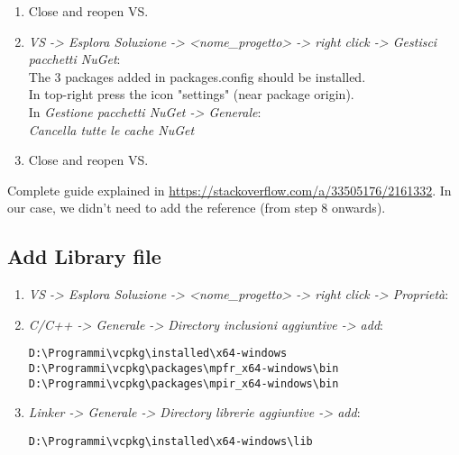 \documentclass[10pt, english, openany]{report}
\begin{document}
\begin{appendices}
\begin{enumerate}
\begin{lstlisting}
.\..\packages\NuGet.CommandLine.5.5.1\tools\NuGet.exe Install -NonInteractive -OutputDirectory packages packages.config
\end{lstlisting}
	
\item Close and reopen VS.

\item \textit{VS -> Esplora Soluzione -> <nome\_progetto> -> right click -> Gestisci pacchetti NuGet}: \\
The 3 packages added in packages.config should be installed.\\
In top-right press the icon "settings" (near package origin). \\
In \textit{Gestione pacchetti NuGet -> Generale}: \\

	\textit{Cancella tutte le cache NuGet}

\item Close and reopen VS.
\end{enumerate}

Complete guide explained in \href{https://stackoverflow.com/a/33505176/2161332}{https://stackoverflow.com/a/33505176/2161332}. In our case, we didn't need to add the reference (from step 8 onwards).


\subsection{Add Library file}
\begin{enumerate}
\item \textit{VS -> Esplora Soluzione -> <nome\_progetto> -> right click -> Proprietà}:

\item \textit{C/C++ -> Generale -> Directory inclusioni aggiuntive -> add}:

\begin{lstlisting}
D:\Programmi\vcpkg\installed\x64-windows
D:\Programmi\vcpkg\packages\mpfr_x64-windows\bin
D:\Programmi\vcpkg\packages\mpir_x64-windows\bin
\end{lstlisting}
	
\item \textit{Linker -> Generale -> Directory librerie aggiuntive -> add}:

\begin{lstlisting}
D:\Programmi\vcpkg\installed\x64-windows\lib
\end{lstlisting}


\end{enumerate}
\end{appendices}
\end{document}
